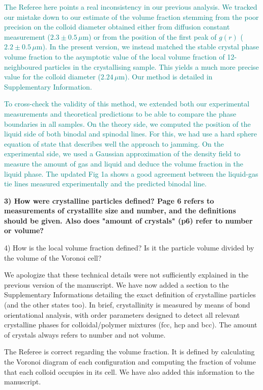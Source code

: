 \documentclass[11pt,a4paper]{article}
\newenvironment{referee}%
{\bigskip\singlespacing\bf}%
{\par\bigskip}
\begin{document}
\textcolor{teal}{The Referee here points a real inconsistency in our previous analysis. We tracked our mistake down to our estimate of the volume fraction stemming from the poor precision on the colloid diameter obtained either from diffusion constant measurement ($2.3\pm0.5\,\mu$m) or from the position of the first peak of $g(r)$ ($2.2\pm0.5\,\mu$m). In the present version, we instead matched the stable crystal phase volume fraction to the asymptotic value of the local volume fraction of 12-neighboured particles in the crystallising sample. This yields a much more precise value for the colloid diameter ($2.24\,\mu$m). Our method is detailed in Supplementary Information.}

\textcolor{teal}{To cross-check the validity of this method, we extended both our experimental measurements and theoretical predictions to be able to compare the phase boundaries in all samples. On the theory side, we computed the position of the liquid side of both binodal and spinodal lines. For this, we had use a hard sphere equation of state that describes well the approach to jamming. On the experimental side, we used a Gaussian approximation of the density field to measure the amount of gas and liquid and deduce the volume fraction in the liquid phase. The updated Fig 1a shows a good agreement between the liquid-gas tie lines measured experimentally and the predicted binodal line.}

\begin{referee}
3) How were crystalline particles defined? Page 6 refers to measurements of crystallite size and number, and the definitions should be given. Also does "amount of crystals" (p6) refer to number or volume?



4) How is the local volume fraction defined? Is it the particle volume divided by the volume of the Voronoi cell?
\end{referee}

We apologize that these technical details were not sufficiently explained in the previous version of the manuscript.
We have now added a section to the Supplementary Informations detailing the exact definition of crystalline particles
(and the other states too). In brief, crystallinity is measured by means of bond orientational analysis, with order
parameters designed to detect all relevant crystalline phases for colloidal/polymer mixtures (fcc, hcp and bcc).
The amount of crystals always refers to number and not volume.

The Referee is correct regarding the volume fraction. It is defined by calculating the Voronoi diagram of each configuration
and computing the fraction of volume that each colloid occupies in its cell. We have also added this information to
the manuscript.
\end{document}

